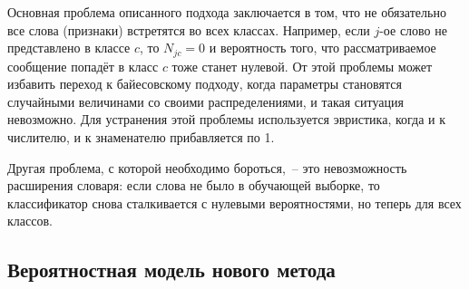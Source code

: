 Основная проблема описанного подхода заключается в том, что не обязательно все слова (признаки)
встретятся во всех классах. Например, если $j$-ое слово не представлено в классе $c$, то $N_{jc}=0$
и вероятность того, что рассматриваемое сообщение попадёт в класс $c$ тоже станет нулевой. От этой
проблемы может избавить переход к байесовскому подходу, когда параметры становятся случайными
величинами со своими распределениями, и такая ситуация невозможно. Для устранения этой проблемы
используется эвристика, когда и к числителю, и к знаменателю прибавляется по 1.

Другая проблема, с которой необходимо бороться,~-- это невозможность расширения словаря: если слова
не было в обучающей выборке, то классификатор снова сталкивается с нулевыми вероятностями, но теперь
для всех классов.

\subsection{Вероятностная модель нового метода}
